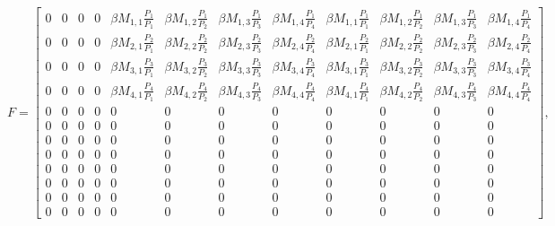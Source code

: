 \documentclass[10pt]{article}
\begin{document}
\clearpage
\begin{equation} \tag{A20}
F=\left[\begin{array}{cccccccccccc}
0 & 0 & 0 & 0 &\beta M_{1,1} \frac{P_1}{P_1} & \beta M_{1,2} \frac{P_1}{P_2} & \beta M_{1,3} \frac{P_1}{P_3} & \beta M_{1,4} \frac{P_1}{P_4} &\beta M_{1,1} \frac{P_1}{P_1} & \beta M_{1,2} \frac{P_1}{P_2} & \beta M_{1,3} \frac{P_1}{P_3} & \beta M_{1,4} \frac{P_1}{P_4}\\
0 & 0 & 0 & 0 &\beta M_{2,1} \frac{P_2}{P_1} & \beta M_{2,2} \frac{P_2}{P_2} & \beta M_{2,3} \frac{P_2}{P_3} & \beta M_{2,4} \frac{P_2}{P_4} &\beta M_{2,1} \frac{P_2}{P_1} & \beta M_{2,2} \frac{P_2}{P_2} & \beta M_{2,3} \frac{P_2}{P_3} & \beta M_{2,4} \frac{P_2}{P_4}\\
0 & 0 & 0 & 0 &\beta M_{3,1} \frac{P_3}{P_1} & \beta M_{3,2} \frac{P_3}{P_2} & \beta M_{3,3} \frac{P_3}{P_3} & \beta M_{3,4} \frac{P_3}{P_4} &\beta M_{3,1} \frac{P_3}{P_1} & \beta M_{3,2} \frac{P_3}{P_2} & \beta M_{3,3} \frac{P_3}{P_3} & \beta M_{3,4} \frac{P_3}{P_4} \\
0 & 0 & 0 & 0 &\beta M_{4,1} \frac{P_4}{P_1} & \beta M_{4,2} \frac{P_4}{P_2} & \beta M_{4,3} \frac{P_4}{P_3} & \beta M_{4,4} \frac{P_4}{P_4} &\beta M_{4,1} \frac{P_4}{P_1} & \beta M_{4,2} \frac{P_4}{P_2} & \beta M_{4,3} \frac{P_4}{P_3} & \beta M_{4,4} \frac{P_4}{P_4}\\
0 & 0 & 0 & 0 & 0 & 0 & 0 & 0 & 0 & 0 & 0 & 0\\
0 & 0 & 0 & 0 & 0 & 0 & 0 & 0 & 0 & 0 & 0 & 0\\
0 & 0 & 0 & 0 & 0 & 0 & 0 & 0 & 0 & 0 & 0 & 0\\
0 & 0 & 0 & 0 & 0 & 0 & 0 & 0 & 0 & 0 & 0 & 0\\
0 & 0 & 0 & 0 & 0 & 0 & 0 & 0 & 0 & 0 & 0 & 0\\
0 & 0 & 0 & 0 & 0 & 0 & 0 & 0 & 0 & 0 & 0 & 0\\
0 & 0 & 0 & 0 & 0 & 0 & 0 & 0 & 0 & 0 & 0 & 0\\
0 & 0 & 0 & 0 & 0 & 0 & 0 & 0 & 0 & 0 & 0 & 0
\end{array}\right],
\end{equation}
\end{document}
